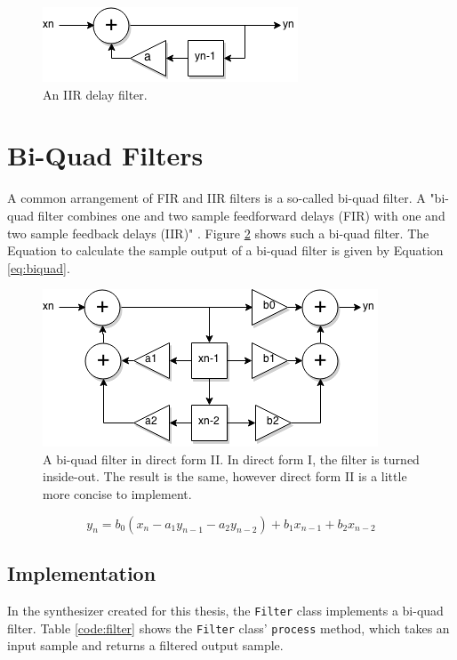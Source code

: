 \begin{figure}
  \includegraphics[scale=0.7]{img/iirdelay}
  \caption{An IIR delay filter.}
  \label{fig:iirdelay}
\end{figure}

\pagebreak

\section{Bi-Quad Filters}

A common arrangement of FIR and IIR filters is a so-called bi-quad filter. A "bi-quad filter combines one and two sample feedforward delays (FIR) with one and two sample feedback delays (IIR)" . Figure \ref{fig:biquad} shows such a bi-quad filter. The Equation to calculate the sample output of a bi-quad filter is given by Equation \ref{eq:biquad}.

\begin{figure}[h!]
  \includegraphics[scale=0.7]{img/biquad}
  \caption{A bi-quad filter in direct form II. In direct form I, the filter is turned inside-out. The result is the same, however direct form II is a little more concise to implement. }
  \label{fig:biquad}
\end{figure}

\begin{equation}
  y_{n} = b_{0}(x_{n} - a_{1}y_{n-1} - a_{2}y_{n-2}) + b_{1}x_{n-1} + b_{2}x_{n-2}
  \label{eq:biquad}
\end{equation}

\subsection{Implementation}

In the synthesizer created for this thesis, the \texttt{Filter} class implements a bi-quad filter. Table \ref{code:filter} shows the \texttt{Filter} class' \texttt{process} method, which takes an input sample and returns a filtered output sample.


